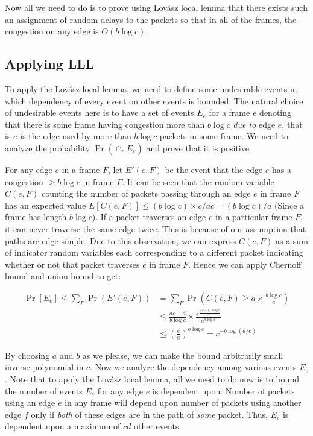 Now all we need to do is to prove using Lov\'asz local lemma that there exists such an assignment of random delays to the packets so that in all of the frames, the congestion on any edge is $O(b\log c) $.

\subsection{Applying LLL}
To apply the Lov\'asz local lemma, we need to define some undesirable events in which dependency of every event on other events is bounded. The natural choice of undesirable events here is to have a set of events $E_e$ for a frame $e$ denoting that there is some frame having congestion more than $b\log c$ \emph{due to} edge $e$, that is $e$ is the edge used by more than $b\log c$ packets in some frame. We need to analyze the probability $\Pr(\cap_{e} \overline{E_e}) $ and prove that it is positive.

For any edge $e$ in a frame $F$, let $E'(e,F) $ be the event that the edge $e$ has a congestion $\geq b\log c $ in frame $F$. It can be seen that the random variable $C(e,F) $ counting the number of packets passing through an edge $e$ in frame $F$ has an expected value $E[C(e,F)]\leq (b\log c)\times c/ac = (b\log c)/a $ (Since a frame has length $b\log c$). If a packet traverses an edge $e$ in a particular frame $F$, it can never traverse the same edge twice. This is because of our assumption that paths are edge simple. Due to this observation, we can express $C(e,F) $ as a sum of indicator random variables each corresponding to a different packet indicating whether or not that packet traverses $e$ in frame $F$. Hence we can apply Chernoff bound and union bound to get:

\begin{equation*}
\begin{align}
 \Pr[E_e] \leq \sum_F \Pr(E'(e,F)) &= \sum_F\Pr\left(C(e,F) \geq a\times \frac{b\log c}{a} \right)\\
 & \leq \frac{ac+d}{b\log c} \times \frac{e^{\frac{(a-1)b\log c}{a} } }{a^{b\log c} } \\
 & \leq \left(\frac{e}{a}\right)^{b\log c} = c^{-b\log(a/e)}
\end{align}
\end{equation*}

By choosing $a$ and $b$ as we please, we can make the bound arbitrarily small inverse polynomial in $c$. Now we analyze the dependency among various events $E_e$.  Note that to apply the Lov\'asz local lemma, all we need to do now is to bound the number of events $E_e$ for any edge $e$ is dependent upon. Number of packets using an edge $e$ in any frame will depend upon number of packets using another edge $f$ only if \emph{both} of these edges are in the path of \emph{some} packet. Thus, $E_e$ is dependent upon a maximum of $cd$  other events.

